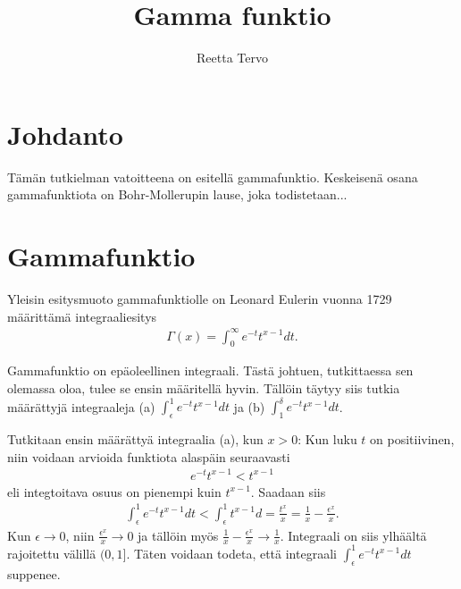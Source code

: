 \documentclass[12pt]{article}
\title{Gamma funktio}
\author{Reetta Tervo}
\theoremstyle{definition}
\theoremstyle{plain}
\begin{document}
\maketitle

\newpage
\tableofcontents

\newpage
\section{Johdanto}
\onehalfspacing
Tämän tutkielman vatoitteena on esitellä gammafunktio. Keskeisenä osana gammafunktiota on Bohr-Mollerupin lause, joka todistetaan...

\newpage





\section{Gammafunktio}
Yleisin esitysmuoto gammafunktiolle on Leonard Eulerin vuonna 1729 määrittämä integraaliesitys
\begin{align*}
     \Gamma(x) = \int_{0}^{\infty} e^{-t} t^{x-1} dt.
\end{align*}

Gammafunktio on epäoleellinen integraali. Tästä johtuen, tutkittaessa sen olemassa oloa, tulee se ensin määritellä hyvin. Tällöin täytyy siis tutkia määrättyjä integraaleja (a) $\int_{\epsilon}^{1} e^{-t} t^{x-1} dt$ ja (b) $\int_{1}^{\delta} e^{-t} t^{x-1} dt$.\newline

Tutkitaan ensin määrättyä integraalia (a), kun $x>0$: \newline
Kun luku $t$ on positiivinen, niin voidaan arvioida funktiota alaspäin seuraavasti
\begin{align*}
    e^{-t} t^{x-1} < t^{x-1}
\end{align*} eli integtoitava osuus on pienempi kuin $t^{x-1}$. Saadaan siis
\begin{align*}
    \int_{\epsilon}^{1} e^{-t} t^{x-1} dt < \int_{\epsilon}^{1} t^{x-1} d = \frac{t^x}{x} = \frac{1}{x} - \frac{\epsilon^x}{x}.
\end{align*}
Kun $\epsilon \rightarrow 0$, niin $\frac{\epsilon^x}{x} \rightarrow 0$ ja tällöin myös $\frac{1}{x}-\frac{\epsilon^x}{x} \rightarrow \frac{1}{x}$. Integraali on siis ylhäältä rajoitettu välillä $(0, 1]$. Täten voidaan todeta, että integraali $\int_{\epsilon}^{1} e^{-t} t^{x-1} dt$ suppenee. \newline
\end{document}

